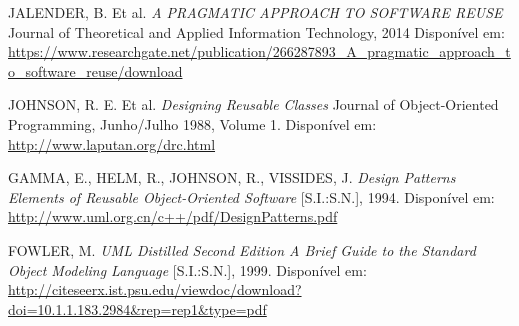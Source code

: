 \documentclass[
    12pt,       %
    openright,      %
    twoside,      %
    a4paper,      %
    english,      %
    french,       %
    spanish,      %
    brazil,       %
    ]{abntex2}
\begin{document}
  \noindent
  JALENDER, B. Et al. \textit{A PRAGMATIC APPROACH TO SOFTWARE REUSE} Journal of Theoretical and Applied Information Technology, 2014
  Disponível em:
  \url{https://www.researchgate.net/publication/266287893_A_pragmatic_approach_to_software_reuse/download}

  \noindent
  JOHNSON, R. E. Et al. \textit{Designing Reusable Classes} Journal of Object-Oriented Programming, Junho/Julho 1988, Volume 1. Disponível em:
  \url{http://www.laputan.org/drc.html}

  \noindent
  GAMMA, E., HELM, R., JOHNSON, R., VISSIDES, J. \textit{Design Patterns Elements of Reusable Object-Oriented Software} [S.I.:S.N.], 1994. Disponível em:
  \url{http://www.uml.org.cn/c++/pdf/DesignPatterns.pdf}

  \noindent
  FOWLER, M. \textit{UML Distilled Second Edition A Brief Guide to the Standard Object Modeling Language} [S.I.:S.N.], 1999. Disponível em:
  \url{http://citeseerx.ist.psu.edu/viewdoc/download?doi=10.1.1.183.2984&rep=rep1&type=pdf}

  \printindex

  
\end{document}

